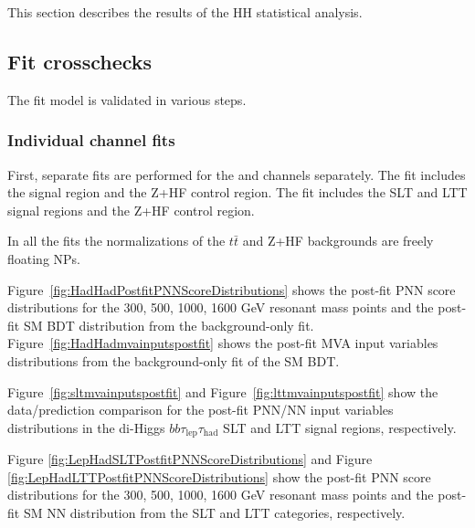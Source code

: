 This section describes the results of the HH statistical analysis.

\subsection{Fit crosschecks}
\label{sec:fitcrosschecks_HH}

The fit model is validated in various steps. 

\subsubsection{Individual channel fits}

First, separate fits are performed for the \hadhad and \lephad channels separately. The \hadhad fit includes the \hadhad signal region and the Z+HF control region. The \lephad fit includes the \lephad SLT and LTT signal regions and the Z+HF control region.   

In all the fits the normalizations of the $t\bar{t}$ and Z+HF backgrounds are freely floating NPs.


Figure~\ref{fig:HadHadPostfitPNNScoreDistributions} shows the post-fit PNN score distributions for the 300, 500, 1000, 1600 GeV resonant mass points and the post-fit SM BDT distribution from the \hadhad background-only fit.  Figure~\ref{fig:HadHadmvainputspostfit} shows the post-fit MVA input variables distributions from the \hadhad background-only fit of the SM BDT.

Figure~\ref{fig:sltmvainputspostfit} and Figure~\ref{fig:lttmvainputspostfit} show the data/prediction comparison for the post-fit PNN/NN input variables distributions in the di-Higgs $bb\tau_\mathrm{lep}\tau_\mathrm{had}$ SLT and LTT signal regions, respectively. 


Figure \ref{fig:LepHadSLTPostfitPNNScoreDistributions} and 
Figure \ref{fig:LepHadLTTPostfitPNNScoreDistributions} show 
the post-fit PNN score distributions for the 300, 500, 1000, 1600 GeV resonant mass points and the post-fit SM NN distribution from the \lephad SLT and LTT categories, respectively.

